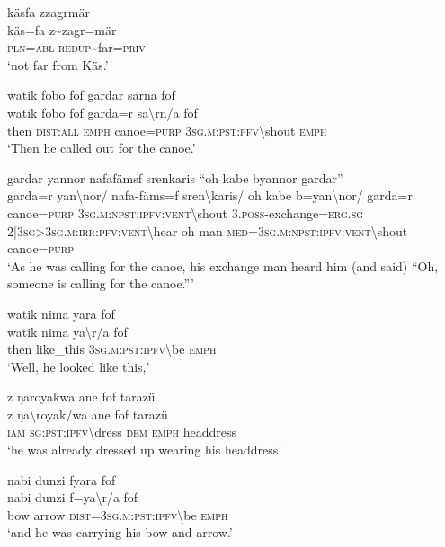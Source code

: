 \ea\label{ex:5:a1492}
käsfa zzagrmär\\
\gll käs=fa	z{\textasciitilde}zagr=mär\\
     \textsc{pln}=\textsc{abl}	\textsc{redup}{\textasciitilde}far=\textsc{priv}\\
\glt `not far from Käs.'
\z

\ea\label{ex:5:a1493}
watik fobo fof gardar sarna fof\\
\gll watik	fobo	fof	garda=r	sa{\textbackslash}rn/a	fof\\
     then	\textsc{dist}:\textsc{all}	\textsc{emph}	canoe=\textsc{purp}	3\textsc{sg}.\textsc{m}:\textsc{pst}:\textsc{pfv}{\textbackslash}shout	\textsc{emph}\\
\glt `Then he called out for the canoe.'
\z

\ea\label{ex:5:a1494}
gardar yannor nafafämsf srenkaris ``oh kabe byannor gardar''\\
\gll garda=r	yan{\textbackslash}nor/	nafa-fäms=f	sren{\textbackslash}karis/	oh	kabe	b=yan{\textbackslash}nor/	garda=r\\
     canoe=\textsc{purp}	3\textsc{sg}.\textsc{m}:\textsc{npst}:\textsc{ipfv}:\textsc{vent}{\textbackslash}shout	3.\textsc{poss}-exchange=\textsc{erg}.\textsc{sg}	2|3\textsc{sg}>3\textsc{sg}.\textsc{m}:\textsc{irr}:\textsc{pfv}:\textsc{vent}{\textbackslash}hear	oh	man	\textsc{med}=3\textsc{sg}.\textsc{m}:\textsc{npst}:\textsc{ipfv}:\textsc{vent}{\textbackslash}shout	canoe=\textsc{purp}\\
\glt `As he was calling for the canoe, his exchange man heard him (and said) ``Oh, someone is calling for the canoe.'''
\z

\ea\label{ex:5:a1496}
watik nima yara fof\\
\gll watik	nima	ya{\textbackslash}r/a	fof\\
     then	like\_this	3\textsc{sg}.\textsc{m}:\textsc{pst}:\textsc{ipfv}{\textbackslash}be	\textsc{emph}\\
\glt `Well, he looked like this,'
\z

\ea\label{ex:5:a1498}
z ŋaroyakwa ane fof tarazü\\
\gll z	ŋa{\textbackslash}royak/wa	ane	fof	tarazü\\
     \textsc{iam}	\textsc{sg}:\textsc{pst}:\textsc{ipfv}{\textbackslash}dress	\textsc{dem}	\textsc{emph}	headdress\\
\glt `he was already dressed up wearing his headdress'
\z

\ea\label{ex:5:a1499}
nabi dunzi fyara fof\\
\gll nabi	dunzi	f=ya{\textbackslash}r/a	fof\\
     bow	arrow	\textsc{dist}=3\textsc{sg}.\textsc{m}:\textsc{pst}:\textsc{ipfv}{\textbackslash}be	\textsc{emph}\\
\glt `and he was carrying his bow and arrow.'
\z

